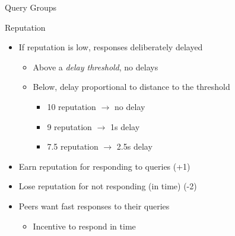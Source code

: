 \documentclass[presentation,english,usenames,dvipsnames]{beamer}
\begin{document}
\begin{frame}{Query Groups}
\begin{minipage}{0.5\textwidth}
\begin{figure}
    \end{figure}
  \end{minipage}
\end{frame}

\begin{frame}{Reputation}
  \begin{itemize}
    \item If reputation is low, responses deliberately delayed
    \begin{itemize}
      \item Above a \emph{delay threshold}, no delays
      \item Below, delay proportional to distance to the threshold
      \begin{itemize}
        \item 10 reputation $\rightarrow$ no delay
        \item 9 reputation $\rightarrow$ 1s delay
        \item 7.5 reputation $\rightarrow$ 2.5s delay
      \end{itemize}
    \end{itemize}

    \pause

    \item Earn reputation for responding to queries (+1)
    \item Lose reputation for not responding (in time) (-2)

    \pause

    \item Peers want fast responses to their queries
    \begin{itemize}
      \item Incentive to respond in time
    \end{itemize}
  \end{itemize}
\end{frame}
\end{document}
